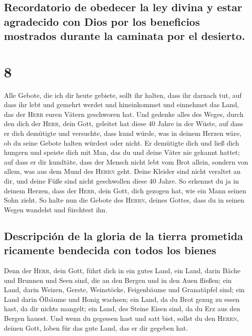 \hypertarget{recordatorio-de-obedecer-la-ley-divina-y-estar-agradecido-con-dios-por-los-beneficios-mostrados-durante-la-caminata-por-el-desierto.}{%
\subsection{Recordatorio de obedecer la ley divina y estar agradecido
con Dios por los beneficios mostrados durante la caminata por el
desierto.}\label{recordatorio-de-obedecer-la-ley-divina-y-estar-agradecido-con-dios-por-los-beneficios-mostrados-durante-la-caminata-por-el-desierto.}}

\hypertarget{section-7}{%
\section{8}\label{section-7}}

 Alle Gebote, die ich dir heute gebiete, sollt ihr halten,
dass ihr darnach tut, auf dass ihr lebt und gemehrt werdet und
hineinkommet und einnehmet das Land, das der \textsc{Herr} euren Vätern
geschworen hat.  Und gedenke alles des Weges, durch den
dich der \textsc{Herr}, dein Gott, geleitet hat diese 40 Jahre in der
Wüste, auf dass er dich demütigte und versuchte, dass kund würde, was in
deinem Herzen wäre, ob du seine Gebote halten würdest oder nicht.
 Er demütigte dich und ließ dich hungern und speiste dich
mit Man, das du und deine Väter nie gekannt hattet; auf dass er dir
kundtäte, dass der Mensch nicht lebt vom Brot allein, sondern von allem,
was aus dem Mund des \textsc{Herrn} geht.  Deine Kleider
sind nicht veraltet an dir, und deine Füße sind nicht geschwollen diese
40 Jahre.  So erkennst du ja in deinem Herzen, dass der
\textsc{Herr}, dein Gott, dich gezogen hat, wie ein Mann seinen Sohn
zieht.  So halte nun die Gebote des \textsc{Herrn}, deines
Gottes, dass du in seinen Wegen wandelst und fürchtest ihn.

\hypertarget{descripciuxf3n-de-la-gloria-de-la-tierra-prometida-ricamente-bendecida-con-todos-los-bienes}{%
\subsection{Descripción de la gloria de la tierra prometida ricamente
bendecida con todos los
bienes}\label{descripciuxf3n-de-la-gloria-de-la-tierra-prometida-ricamente-bendecida-con-todos-los-bienes}}

 Denn der \textsc{Herr}, dein Gott, führt dich in ein
gutes Land, ein Land, darin Bäche und Brunnen und Seen sind, die an den
Bergen und in den Auen fließen;  ein Land, darin Weizen,
Gerste, Weinstöcke, Feigenbäume und Granatäpfel sind; ein Land darin
Ölbäume und Honig wachsen;  ein Land, da du Brot genug zu
essen hast, da dir nichts mangelt; ein Land, des Steine Eisen sind, da
du Erz aus den Bergen hauest.  Und wenn du gegessen hast
und satt bist, sollst du den \textsc{Herrn}, deinen Gott, loben für das
gute Land, das er dir gegeben hat.

